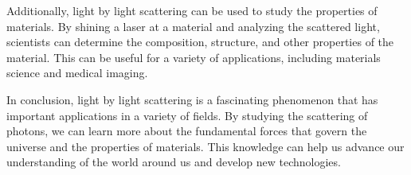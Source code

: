 \documentclass{article}
\begin{document}
Additionally, light by light scattering can be used to study the properties of materials. By shining a laser at a material and analyzing the scattered light, scientists can determine the composition, structure, and other properties of the material. This can be useful for a variety of applications, including materials science and medical imaging.

In conclusion, light by light scattering is a fascinating phenomenon that has important applications in a variety of fields. By studying the scattering of photons, we can learn more about the fundamental forces that govern the universe and the properties of materials. This knowledge can help us advance our understanding of the world around us and develop new technologies.

\newpage
\nocite{*}
\printbibliography
\end{document}
